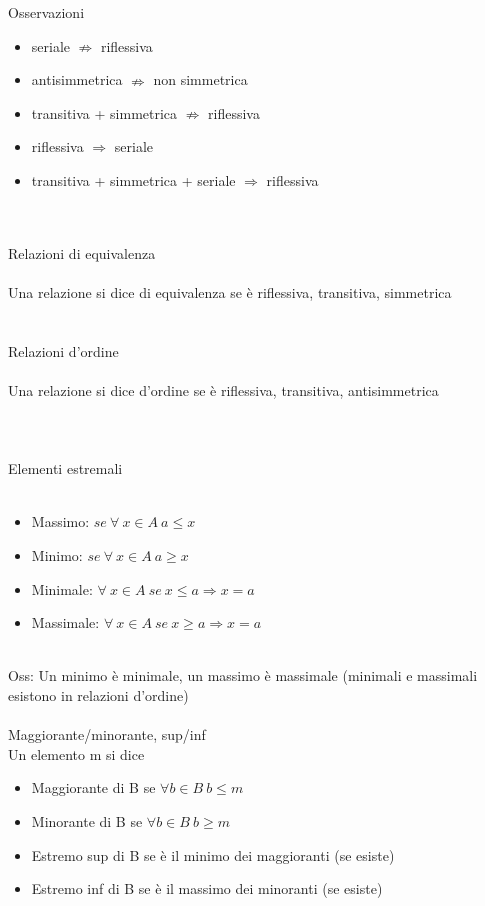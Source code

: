 \documentclass{article}
\begin{document}
		{\large Osservazioni}
		\begin{itemize}
			\item seriale \(\nRightarrow\) riflessiva
			\item antisimmetrica \(\nRightarrow\) non simmetrica
			\item transitiva + simmetrica \(\nRightarrow\) riflessiva
			\item riflessiva \(\Rightarrow\) seriale
			\item transitiva + simmetrica + seriale \(\Rightarrow\) riflessiva
		\end{itemize}
		\ \\\\
		
		{\Large Relazioni di equivalenza}\\\\
		{\large Una relazione si dice di equivalenza se è riflessiva, transitiva, simmetrica}\\\\\\
	
		{\Large Relazioni d'ordine}\\\\
		{\large Una relazione si dice d'ordine se è riflessiva, transitiva, antisimmetrica}\\\\\\\\
		
		{\Large Elementi estremali}\\\\
		\begin{itemize}
			\item Massimo: \(se \ \forall \ x \in A \ a\leq x\)
			\item Minimo: \(se \ \forall \ x \in A \ a\geq x\)
			\item Minimale: \(\forall \ x \in A \ se\ x \leq a \Rightarrow x=a\)
			\item Massimale: \(\forall \ x \in A \ se\ x \geq a \Rightarrow x=a\)
		\end{itemize}
	 	\ \\
	 	Oss: Un minimo è minimale, un massimo è massimale (minimali e massimali esistono in relazioni d'ordine)\\\\
	 	{\large Maggiorante/minorante, sup/inf}\\
	 	Un elemento m si dice
	 	\begin{itemize}
	 		\item Maggiorante di B se \(\forall b \in B \  b \leq m\)
	 		\item Minorante di B se \(\forall b \in B \  b \geq m\)
	 		\item Estremo sup di B se è il minimo dei maggioranti (se esiste)
	 		\item Estremo inf di B se è il massimo dei minoranti (se esiste)
 		\end{itemize}
 		
\end{document}
